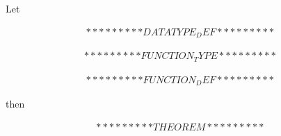 \documentclass[a4paper]{article}
\begin{document}
\pagestyle{empty}

\begin{center}


\fontsize{18}{5}\selectfont
Let\\
\vspace{0.65cm}

\begin{gather*}
*********DATATYPE_DEF*********
\end{gather*}

\begin{gather*}
*********FUNCTION_TYPE*********
\end{gather*}

\begin{gather*}
*********FUNCTION_DEF*********
\end{gather*}

\vspace{0.3cm}
then

\fontsize{18}{2}\selectfont
\begin{gather*}
*********THEOREM*********
\end{gather*}

\end{center}
\end{document}

